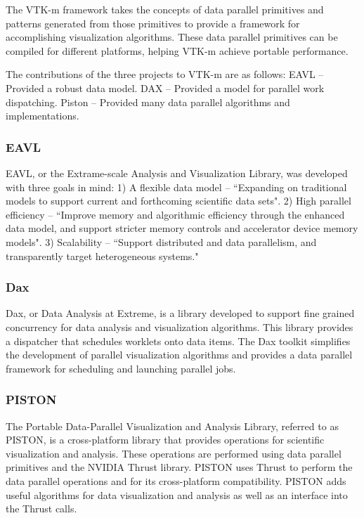 The VTK-m framework takes the concepts of data parallel primitives and patterns generated from those primitives to provide a framework for accomplishing visualization algorithms.
%
These data parallel primitives can be compiled for different platforms, helping VTK-m achieve portable performance.
% 
\cite{moreland2015vtk}
\cite{moreland2014vtk}

The contributions of the three projects to VTK-m are as follows:
EAVL -- Provided a robust data model. DAX -- Provided a model for parallel work dispatching. Piston -- Provided many data parallel algorithms and implementations.

\subsubsection*{\textbf{EAVL}}

EAVL, or the Extrame-scale Analysis and Visualization Library, was developed with three goals in mind: 
%
1) A flexible data model -- ``Expanding on traditional models to support current and forthcoming scientific data sets". 
%
2) High parallel efficiency -- ``Improve memory and algorithmic efficiency through the enhanced data model, and support stricter memory controls and accelerator device memory models".
%
3) Scalability -- ``Support distributed and data parallelism, and transparently target heterogeneous systems."
~\cite{jeremyEAVL}

\subsubsection*{\textbf{Dax}}

Dax, or Data Analysis at Extreme, is a library developed to support fine grained concurrency for data analysis and visualization algorithms.
%
This library provides a dispatcher that schedules worklets onto data items.
%
The Dax toolkit simplifies the development of parallel visualization algorithms and provides a data parallel framework for scheduling and launching parallel jobs.
~\cite{morelanddax}
~\cite{moreland2011dax}

\subsubsection*{\textbf{PISTON}} 

The Portable Data-Parallel Visualization and Analysis Library, referred to as PISTON, is a cross-platform library that provides operations for scientific visualization and analysis.
%
These operations are performed using data parallel primitives and the NVIDIA Thrust library.
%
PISTON uses Thrust to perform the data parallel operations and for its cross-platform compatibility.
%
PISTON adds useful algorithms for data visualization and analysis as well as an interface into the Thrust calls.
~\cite{PISTON}
